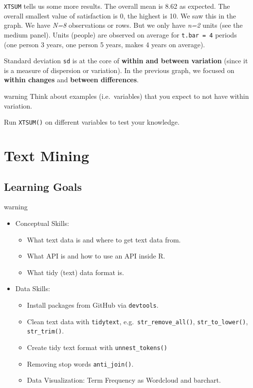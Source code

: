 \documentclass[
]{book}
\providecommand{\tightlist}{%
  \setlength{\itemsep}{0pt}\setlength{\parskip}{0pt}}
\begin{document}
\texttt{XTSUM} tells us some more results. The overall mean is 8.62 as expected. The overall smallest value of satisfaction is 0, the highest is 10. We saw this in the graph. We have \emph{N=8} observations or rows. But we only have \emph{n=2} units (see the medium panel). Units (people) are observed on average for \texttt{t.bar\ =\ 4} periods (one person 3 years, one person 5 years, makes 4 years on average).

Standard deviation \texttt{sd} is at the core of \textbf{within and between variation} (since it is a measure of dispersion or variation). In the previous graph, we focused on \textbf{within changes} and \textbf{between differences}.

\begin{infobox2}warning
Think about examples (i.e.~variables) that you expect to not have within variation.

\end{infobox2}

Run \texttt{XTSUM()} on different variables to test your knowledge.

\hypertarget{text-mining}{%
\chapter{Text Mining}\label{text-mining}}

\hypertarget{learning-goals-3}{%
\section{Learning Goals}\label{learning-goals-3}}

\begin{infobox2}warning

\begin{itemize}
\tightlist
\item
  Conceptual Skills:

  \begin{itemize}
  \tightlist
  \item
    What text data is and where to get text data from.
  \item
    What API is and how to use an API inside R.
  \item
    What tidy (text) data format is.
  \end{itemize}
\item
  Data Skills:

  \begin{itemize}
  \tightlist
  \item
    Install packages from GitHub via \texttt{devtools}.
  \item
    Clean text data with \texttt{tidytext}, e.g.~\texttt{str\_remove\_all()}, \texttt{str\_to\_lower()}, \texttt{str\_trim()}.
  \item
    Create tidy text format with \texttt{unnest\_tokens()}
  \item
    Removing stop words \texttt{anti\_join()}.
  \item
    Data Visualization: Term Frequency as Wordcloud and barchart.
  \end{itemize}
\end{itemize}

\end{infobox2}
\end{document}
